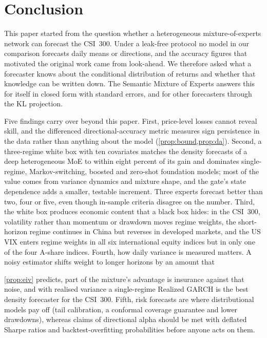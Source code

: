 \section{Conclusion}\label{sec:conclusion}

This paper started from the question whether a heterogeneous mixture-of-experts network can forecast
the CSI~300. Under a leak-free protocol no model in our comparison forecasts daily means or directions,
and the accuracy figures that motivated the original work came from look-ahead. We therefore asked
what a forecaster knows about the conditional distribution of returns and whether that knowledge can
be written down. The Semantic Mixture of Experts answers this for itself in closed form with standard
errors, and for other forecasters through the KL projection.

Five findings carry over beyond this paper. First, price-level losses cannot reveal skill, and the
differenced directional-accuracy metric measures sign persistence in the data rather than anything
about the model (\cref{prop:bound,prop:da}). Second, a three-regime white box with ten covariates
matches the density forecasts of a deep heterogeneous MoE to within eight percent of its gain and
dominates single-regime, Markov-switching, boosted and zero-shot foundation models; most of the value
comes from variance dynamics and mixture shape, and the gate's state dependence adds a smaller,
testable increment. Three experts forecast better than two, four or five, even though in-sample
criteria disagree on the number. Third, the white box produces economic content that a black box
hides: in the CSI~300, volatility rather than momentum or drawdown moves regime weights, the
short-horizon regime continues in China but reverses in developed markets, and the US VIX enters
regime weights in all six international equity indices but in only one of the four A-share indices.
Fourth, how daily variance is measured matters. A noisy estimator shifts weight to longer horizons
by an amount that

\cref{prop:eiv} predicts, part of the mixture's advantage is insurance against that noise, and with
realised variance a single-regime Realized GARCH is the best density forecaster for the CSI~300.
Fifth, risk forecasts are where distributional models pay off (tail calibration, a conformal coverage
guarantee and lower drawdowns), whereas claims of directional alpha should be met with deflated
Sharpe ratios and backtest-overfitting probabilities before anyone acts on them.

